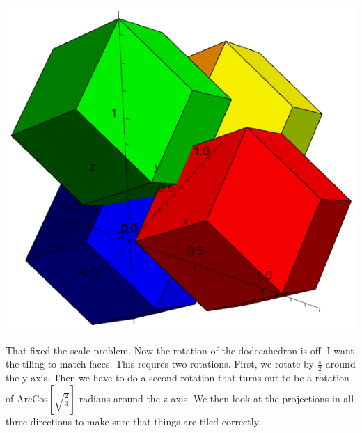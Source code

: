 \documentclass{article}
\begin{document}
\includegraphics{3D_tiling_gr8.eps}

That fixed the scale problem. Now the rotation of the dodecahedron is off. I want the tiling to match faces. This requres two rotations. First, we
rotate by \(\frac{\pi }{2}\) around the y-axis. Then we have to do a second rotation that turns out to be a rotation of \(\text{ArcCos}\left[\sqrt{\frac{2}{3}}\right]\)
radians around the z-axis. We then look at the projections in all three directions to make sure that things are tiled correctly.
\end{document}
